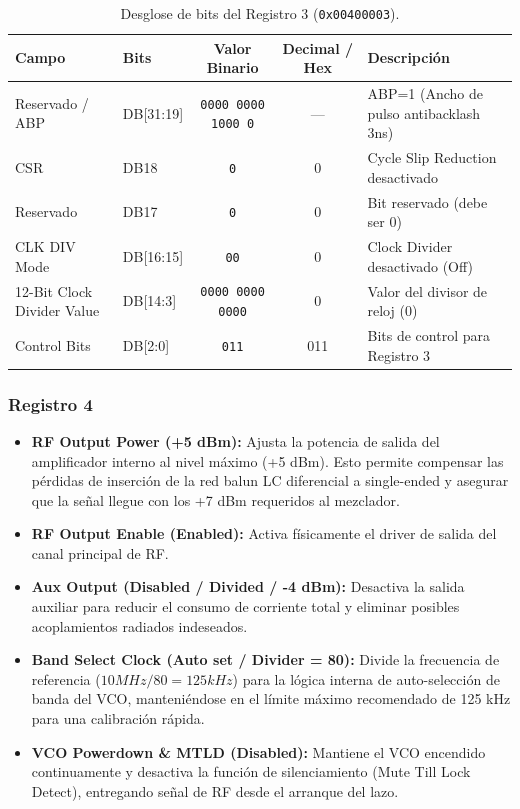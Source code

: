 \documentclass[11pt,a4paper,twoside]{report}
\begin{document}
	\begin{table}[htbp]
		\centering
		\begin{tabularx}{\textwidth}{l l c c X}
			\toprule
			\textbf{Campo} & \textbf{Bits} & \textbf{Valor Binario} & \textbf{Decimal / Hex} & \textbf{Descripción} \\
			\midrule
			Reservado / ABP & DB[31:19] & \texttt{0000 0000 1000 0} & --- & ABP=1 (Ancho de pulso antibacklash 3ns) \\
			CSR & DB18 & \texttt{0} & 0 & Cycle Slip Reduction desactivado \\
			Reservado & DB17 & \texttt{0} & 0 & Bit reservado (debe ser 0) \\
			CLK DIV Mode & DB[16:15] & \texttt{00} & 0 & Clock Divider desactivado (Off) \\
			12-Bit Clock Divider Value & DB[14:3] & \texttt{0000 0000 0000} & 0 & Valor del divisor de reloj ($0$) \\
			Control Bits & DB[2:0] & \texttt{011} & 011 & Bits de control para Registro 3 \\
			\bottomrule
		\end{tabularx}
		\caption{Desglose de bits del Registro 3 (\texttt{0x00400003}).}
		\label{tab:adf4350_reg3}
	\end{table}\newpage
	
	
	\subsubsection{Registro 4}
	\begin{itemize}
		\item \textbf{RF Output Power (+5 dBm):} Ajusta la potencia de salida del amplificador interno al nivel máximo (+5 dBm). Esto permite compensar las pérdidas de inserción de la red balun LC diferencial a single-ended y asegurar que la señal llegue con los +7 dBm requeridos al mezclador.
		
		\item \textbf{RF Output Enable (Enabled):} Activa físicamente el driver de salida del canal principal de RF.
		
		\item \textbf{Aux Output (Disabled / Divided / -4 dBm):} Desactiva la salida auxiliar para reducir el consumo de corriente total y eliminar posibles acoplamientos radiados indeseados.
		
		\item \textbf{Band Select Clock (Auto set / Divider = 80):} Divide la frecuencia de referencia ($10MHz / 80 = 125kHz$) para la lógica interna de auto-selección de banda del VCO, manteniéndose en el límite máximo recomendado de 125 kHz para una calibración rápida.
		
		\item \textbf{VCO Powerdown \& MTLD (Disabled):} Mantiene el VCO encendido continuamente y desactiva la función de silenciamiento (Mute Till Lock Detect), entregando señal de RF desde el arranque del lazo.
	\end{itemize}
	
\end{document}
